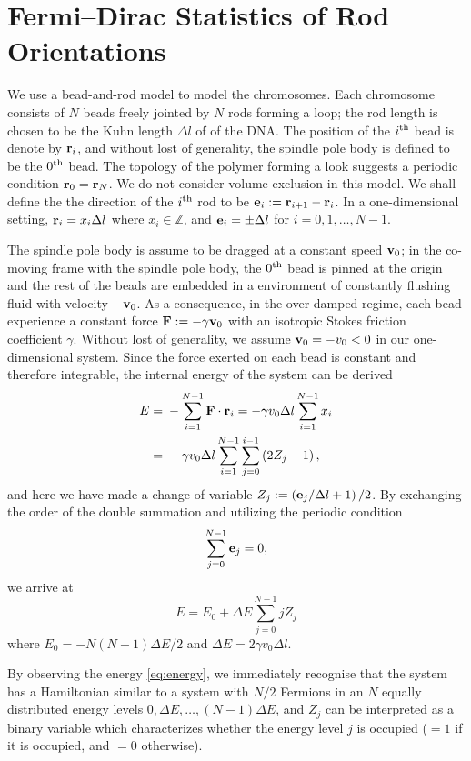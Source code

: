 \documentclass[twocolumn,showpacs,preprintnumbers,amsmath,amssymb,pre]{revtex4-1}
\renewcommand{\l}{\left}
\renewcommand{\r}{\right}
\newcommand{\eq}[2]{\begin{equation}#1\label{#2}\end{equation}}
\newcommand{\al}[2]{\begin{align}#1\label{#2}\end{align}}
\begin{document}
\section{Fermi--Dirac Statistics of Rod Orientations} \label{sec:FD}
\newcommand{\vx}{{\bf r}}
\newcommand{\ve}{{\bf e}}
We use a bead-and-rod model to model the chromosomes. Each chromosome consists of $N$ beads freely jointed by $N$ rods forming a loop; the rod length is chosen to be the Kuhn length $\Delta l$ of of the DNA. 
The position of the $i^{\rm th}$ bead is denote by $\vx_i$, and without lost of generality, the spindle pole body is defined to be the $0^{\rm th}$ bead. The topology of the polymer forming a look suggests a periodic condition $\vx_0=\vx_N$. We do not consider volume exclusion in this model. We shall define the the direction of the $i^{\rm th}$ rod to be $\ve_i:=\vx_{i+1} - \vx_{i}$.  In a one-dimensional setting, $\vx_i = x_i \Delta l$ where $x_i \in \mathbb{Z}$, and $\ve_i=\pm \Delta l$ for $i=0, 1, \ldots, N-1$. 

The spindle pole body is assume to be dragged at a constant speed ${\bf v}_0$; in the co-moving frame with the spindle pole body, the $0^{\rm th}$ bead is pinned at the origin and the rest of the beads are embedded in a environment of constantly flushing fluid with velocity $-{\bf v}_0$. As a consequence, in the over damped regime, each bead experience a constant force $ {\bf F} := -\gamma {\bf v}_0$ with an isotropic Stokes friction coefficient $\gamma$. Without lost of generality, we assume ${\bf v}_0 = -v_0<0$ in our one-dimensional system. Since the force exerted on each bead is constant and therefore integrable, the internal energy of the system can be derived
\al{
E ={}& -\sum_{i=1}^{N-1} {\bf F} \cdot \vx_i = -\gamma v_0 \Delta l \sum_{i=1}^{N-1} x_i  \nonumber \\
={}& - \gamma v_0 \Delta l  \sum_{i=1}^{N-1} \sum_{j=0}^{i-1} \l(2 Z_j - 1\r),
}{}
and here we have made a change of variable $Z_j := \l(\ve_j/\Delta l+1\r)/2$. By exchanging the order of the double summation and utilizing the periodic condition 
\eq{
\sum_{j=0}^{N-1} \ve_j = 0,
}{eq:periodic}
we arrive at 
\eq{
E = E_0 + \Delta E \sum_{j=0}^{N-1} j Z_j
}{eq:energy}
where $E_0= - N(N-1) \Delta E /2$ and $\Delta E = 2  \gamma v_0 \Delta l$. 

By observing the energy \eqref{eq:energy}, we immediately recognise that the system has a Hamiltonian similar to a system with $N/2$ Fermions in an $N$ equally distributed energy levels $0, \Delta E, \ldots, (N-1) \Delta E$, and $Z_j$ can be interpreted as a binary variable which characterizes whether the energy level $j$ is occupied ($=1$ if it is occupied, and $=0$ otherwise). 
\end{document}
